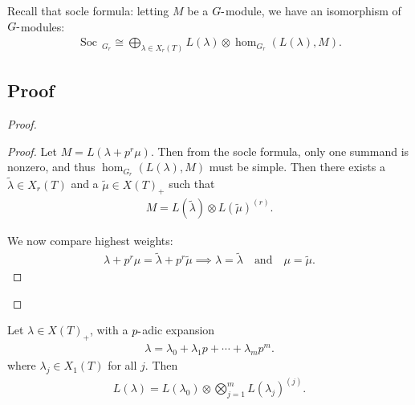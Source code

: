 Recall that socle formula: letting \(M\) be a \(G{\hbox{-}}\)module, we
have an isomorphism of \(G{\hbox{-}}\)modules:
\begin{align*}  \operatorname{Soc}\,_{G_r} \cong \bigoplus_{\lambda \in X_r(T)} L(\lambda) \otimes\hom_{G_r}(L(\lambda), M) .\end{align*}

\hypertarget{proof}{%
\subsection{Proof}\label{proof}}

\begin{proof}

\begin{proof}

Let \(M = L(\lambda + p^r \mu)\). Then from the socle formula, only one
summand is nonzero, and thus \(\hom_{G_r}(L(\lambda), M)\) must be
simple. Then there exists a \(\tilde \lambda \in X_r(T)\) and a
\(\tilde \mu \in X(T)_+\) such that
\begin{align*}   M = L(\tilde \lambda) \otimes L(\tilde\mu)^{(r)} .\end{align*}

We now compare highest weights:
\begin{align*}   \lambda + p^r \mu = \tilde \lambda + p^r \tilde \mu \implies \lambda = \tilde \lambda {\quad \text{and} \quad} \mu = \tilde \mu .\end{align*}

\end{proof}

\end{proof}

\begin{theorem}[Steinberg]

\begin{theorem}[Steinberg]

Let \(\lambda \in X(T)_+\), with a \(p{\hbox{-}}\)adic expansion
\begin{align*}   \lambda = \lambda_0 + \lambda_1 p + \cdots + \lambda_m p^m .\end{align*}
where \(\lambda_j \in X_1(T)\) for all \(j\). Then
\begin{align*}   L(\lambda) = L(\lambda_0) \otimes\bigotimes_{j=1}^m L(\lambda_j)^{(j)} .\end{align*}

\end{theorem}

\end{theorem}

